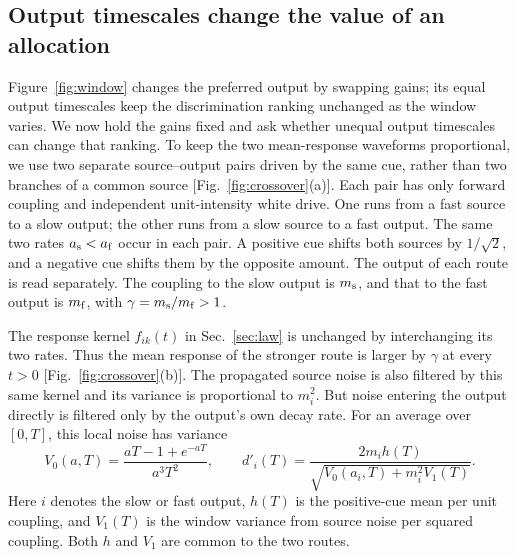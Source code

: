 \documentclass[aps,10pt,onecolumn,superscriptaddress,nofootinbib,longbibliography,
  amsmath,amssymb,floatfix]{revtex4-2}
\begin{document}
\subsection{Output timescales change the value of an allocation}
\label{sec:crossover}

Figure~\ref{fig:window} changes the preferred output by swapping
gains; its equal output timescales keep the discrimination ranking
unchanged as the window varies. We now hold the gains fixed and
ask whether unequal output timescales can change that ranking.
To keep the two mean-response waveforms proportional, we use
two separate source--output pairs driven by the same cue,
rather than two branches of a common source
[Fig.~\ref{fig:crossover}(a)]. Each pair has only forward
coupling and independent unit-intensity white drive. One runs
from a fast source to a slow output; the other runs from a slow
source to a fast output. The same two rates
\(a_{\rm s}<a_{\rm f}\) occur in each pair. A positive cue shifts
both sources by \(1/\sqrt{2}\), and a negative cue shifts them
by the opposite amount. The output of each route is read
separately. The coupling to the slow output is \(m_{\rm s}\),
and that to the fast output is \(m_{\rm f}\), with
\(\gamma=m_{\rm s}/m_{\rm f}>1\).

The response kernel \(f_{ik}(t)\) in Sec.~\ref{sec:law} is
unchanged by interchanging its two rates. Thus the mean
response of the stronger route is larger by \(\gamma\) at
every \(t>0\) [Fig.~\ref{fig:crossover}(b)]. The propagated
source noise is also filtered by this same kernel and its
variance is proportional to \(m_i^2\). But noise entering
the output directly is filtered only by the output's own
decay rate. For an average over \([0,T]\), this local noise
has variance
\begin{equation}
 V_0(a,T)=\frac{aT-1+e^{-aT}}{a^3T^2},
 \qquad
 d'_i(T)=\frac{2m_i h(T)}
  {\sqrt{V_0(a_i,T)+m_i^2 V_1(T)}} .
 \label{eq:crossnoise}
\end{equation}
Here \(i\) denotes the slow or fast output, \(h(T)\) is the
positive-cue mean per unit coupling, and \(V_1(T)\) is the
window variance from source noise per squared coupling.
Both \(h\) and \(V_1\) are common to the two routes.
\end{document}
